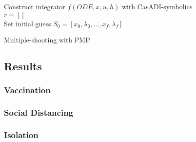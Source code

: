 \begin{algorithm}[H]
\SetAlgoLined
{}
Construct integrator $f(ODE, x, u, h)$ with CasADI-symbolics\\

$r = []$\\
 Set initial guess $S_0 = [x_0, \lambda_0, \dots, x_f, \lambda_f]$\\
 \caption{Multiple-shooting with PMP}
 \label{alg:Multiple_Shooting_Integration_PMP}
\end{algorithm}

\subsection{Results}
\subsubsection{Vaccination}
\subsubsection{Social Distancing}
\subsubsection{Isolation}





